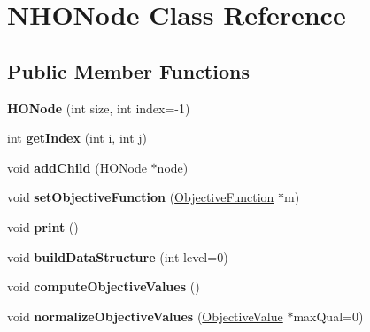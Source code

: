 \hypertarget{classNHONode}{\section{N\-H\-O\-Node Class Reference}
\label{classNHONode}
}
\subsection*{Public Member Functions}
\begin{DoxyCompactItemize}
\item 
\hypertarget{classNHONode_a40a898d432184d7e5f23f2a9a75af9b5}{{\bfseries H\-O\-Node} (int size, int index=-\/1)}\label{classNHONode_a40a898d432184d7e5f23f2a9a75af9b5}

\item 
\hypertarget{classNHONode_a680f83500704c65f855241c05f962da6}{int {\bfseries get\-Index} (int i, int j)}\label{classNHONode_a680f83500704c65f855241c05f962da6}

\item 
\hypertarget{classNHONode_a415667d5e0cd35f4a8f9a19da320280f}{void {\bfseries add\-Child} (\hyperlink{classHONode}{H\-O\-Node} $\ast$node)}\label{classNHONode_a415667d5e0cd35f4a8f9a19da320280f}

\item 
\hypertarget{classNHONode_ae5e218f082ae0ae5e0eddae135604a0e}{void {\bfseries set\-Objective\-Function} (\hyperlink{classObjectiveFunction}{Objective\-Function} $\ast$m)}\label{classNHONode_ae5e218f082ae0ae5e0eddae135604a0e}

\item 
\hypertarget{classNHONode_a9bc980f671fcd3574ebabe45d909694b}{void {\bfseries print} ()}\label{classNHONode_a9bc980f671fcd3574ebabe45d909694b}

\item 
\hypertarget{classNHONode_a272cccb7677334ce2b7525ae32d06edb}{void {\bfseries build\-Data\-Structure} (int level=0)}\label{classNHONode_a272cccb7677334ce2b7525ae32d06edb}

\item 
\hypertarget{classNHONode_a0c6c281eb16a3525ca1c0046abb53c8a}{void {\bfseries compute\-Objective\-Values} ()}\label{classNHONode_a0c6c281eb16a3525ca1c0046abb53c8a}

\item 
\hypertarget{classNHONode_af3ff05d5429f657e1e8fe881f88e711b}{void {\bfseries normalize\-Objective\-Values} (\hyperlink{classObjectiveValue}{Objective\-Value} $\ast$max\-Qual=0)}\label{classNHONode_af3ff05d5429f657e1e8fe881f88e711b}


\end{DoxyCompactItemize}
